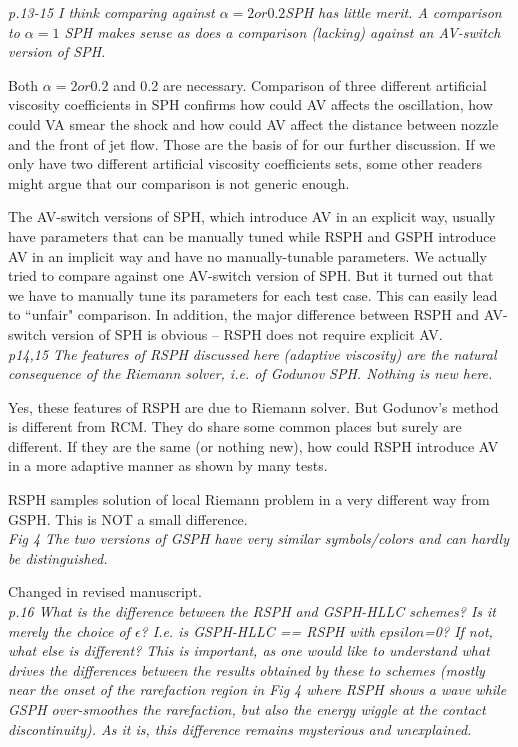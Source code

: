 \documentclass[10pt,a4paper]{article}
\begin{document}
\textit{p.13-15 I think comparing against $\alpha = 2 or 0.2 $SPH has little merit.
A comparison to $\alpha=1$ SPH makes sense as does a comparison (lacking)
against an AV-switch version of SPH.}

Both $\alpha = 2 or 0.2 $ and 0.2 are necessary. Comparison of three different artificial viscosity coefficients in SPH confirms how could AV affects the oscillation, how could VA smear the shock and how could AV affect the distance between nozzle and the front of jet flow. Those are the basis of for our further discussion. If we only have two different artificial viscosity coefficients sets, some other readers might argue that our comparison is not generic enough.

The AV-switch versions of SPH, which introduce AV in an explicit way, usually have parameters that can be manually tuned while RSPH and GSPH introduce AV in an implicit way and have no manually-tunable parameters. 
We actually tried to compare against one AV-switch version of SPH. But it turned out that we have to manually tune its parameters for each test case. This can easily lead to ``unfair" comparison. In addition, the major difference between RSPH and AV-switch version of SPH is  obvious -- RSPH does not require explicit AV.
\\[3pt]

\textit{p14,15 The features of RSPH discussed here (adaptive viscosity) are the
natural consequence of the Riemann solver, i.e. of Godunov SPH. Nothing
is new here.}

Yes, these features of RSPH are due to Riemann solver. 
But Godunov's method is different from RCM.
They do share some common places but surely are different. If they are the same (or nothing new), how could RSPH introduce AV in a more adaptive manner as shown by many tests.

RSPH samples solution of local Riemann problem in a very different way from GSPH. This is NOT a small difference.
\\[3pt]

\textit{Fig 4 The two versions of GSPH have very similar symbols/colors and can hardly be distinguished.}

Changed in revised manuscript. 
\\[3pt]

\textit{p.16 What is the difference between the RSPH and GSPH-HLLC schemes? Is it
merely the choice of $\epsilon$? I.e. is GSPH-HLLC == RSPH with $epsilon$=0? If not, what else is different? This is important, as one would like to understand what drives the differences between the results obtained by these to schemes (mostly near
the onset of the rarefaction region in Fig 4 where RSPH shows a wave while GSPH over-smoothes the rarefaction, but also the energy wiggle at
the contact discontinuity). As it is, this difference remains mysterious and unexplained.}
\end{document}
